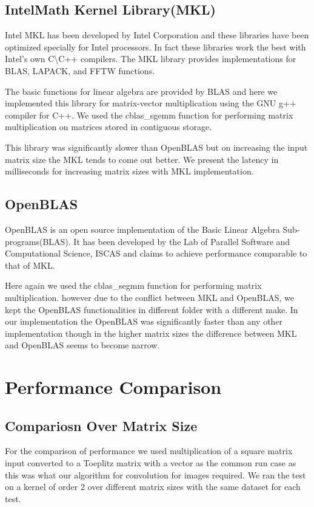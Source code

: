 \documentclass[10pt,a4paper,titlepage]{article}
\begin{document}
\subsection{Intel\circledR Math Kernel Library(MKL)}

Intel MKL has been developed by Intel Corporation and these libraries have been optimized specially for Intel processors. In fact these libraries work the best with Intel's own C\textbackslash C++ compilers. The MKL library provides implementations for BLAS, LAPACK, and FFTW functions.\cite{MKL}

The basic functions for linear algebra are provided by BLAS and here we implemented this library for matrix-vector multiplication using the GNU g++ compiler for C++. We used the cblas\_sgemm function for performing matrix multiplication on matrices stored in contiguous storage.

 
This library was significantly slower than OpenBLAS but on increasing the input matrix size the MKL tends to come out better. We present the latency in milliseconds for increasing matrix sizes with MKL implementation.

\subsection{OpenBLAS}

OpenBLAS is an open source implementation of the Basic Linear Algebra Sub-programs(BLAS). It has been developed by the Lab of Parallel Software and Computational Science, ISCAS and claims to achieve performance comparable to that of MKL.\cite{OpenBLAS}

Here again we used the cblas\_segmm function for performing matrix multiplication. however due to the conflict between MKL and OpenBLAS, we kept the OpenBLAS functionalities in different folder with a different make. In our implementation the OpenBLAS was significantly faster than any other implementation though in the higher matrix sizes the difference between MKL and OpenBLAS seems to become narrow.

\section{Performance Comparison}
\subsection{Compariosn Over Matrix Size}
For the comparison of performance we used multiplication of a square matrix  input converted to a Toeplitz matrix with a vector as the common run case as this was what our algorithm for convolution for images required. We ran the test on a kernel of order 2 over different matrix sizes with the same dataset for each test.
\end{document}
